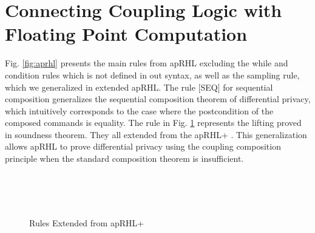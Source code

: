 \documentclass[a4paper,11pt]{article}
\begin{document}
\section{
Connecting Coupling Logic
%
with Floating Point Computation
}
%
Fig. \ref{fig:aprhl} presents the main rules from apRHL excluding the while and condition rules which is not defined in out syntax, as well as the sampling rule, which we generalized in extended apRHL.
The rule [SEQ] for sequential composition generalizes the sequential composition theorem of differential privacy, which intuitively corresponds to the case where the postcondition of the composed commands is equality.
The rule in Fig. \ref{fig:aprhlplus} represents the lifting proved in soundness theorem. They all extended from the apRHL+ \cite{barthe2016proving}. This generalization allows apRHL to prove differential privacy using the coupling composition principle when the standard composition theorem is insufficient.
%
\begin{figure}[t]
\\
\\
\\
\caption{Rules Extended from apRHL+}
\label{fig:aprhlplus}
\end{figure}
\end{document}
